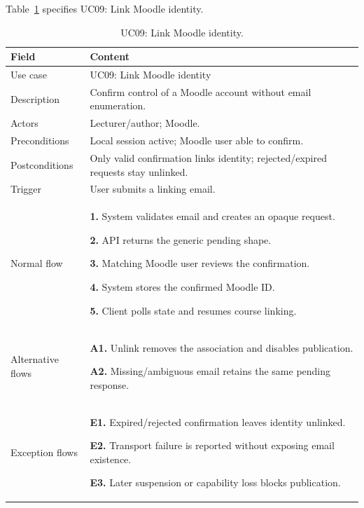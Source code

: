 \needspace{.39\textheight}
Table~\ref{tab:uc-09} specifies UC09: Link Moodle identity.
\begin{table}[H]\centering\footnotesize{}\renewcommand{\arraystretch}{1.05}
\caption{UC09: Link Moodle identity.}\label{tab:uc-09}
\begin{tabular}{|p{2.8cm}|p{11.9cm}|}\hline
\textbf{Field} & \textbf{Content}\\\hline
Use case & UC09: Link Moodle identity\\\hline
Description & Confirm control of a Moodle account without email enumeration.\\\hline
Actors & Lecturer/author; Moodle.\\\hline
Preconditions & Local session active; Moodle user able to confirm.\\\hline
Postconditions & Only valid confirmation links identity; rejected/expired requests stay unlinked.\\\hline
Trigger & User submits a linking email.\\\hline
Normal flow & \textbf{1.} System validates email and creates an opaque request.\par \textbf{2.} API returns the generic pending shape.\par \textbf{3.} Matching Moodle user reviews the confirmation.\par \textbf{4.} System stores the confirmed Moodle ID.\par \textbf{5.} Client polls state and resumes course linking.\\\hline
Alternative flows & \textbf{A1.} Unlink removes the association and disables publication.\par \textbf{A2.} Missing/ambiguous email retains the same pending response.\\\hline
Exception flows & \textbf{E1.} Expired/rejected confirmation leaves identity unlinked.\par \textbf{E2.} Transport failure is reported without exposing email existence.\par \textbf{E3.} Later suspension or capability loss blocks publication.\\\hline
\end{tabular}\end{table}

